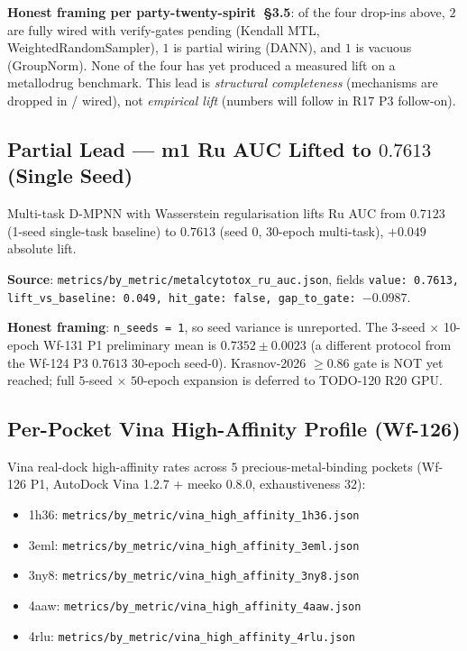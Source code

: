 \noindent\textbf{Honest framing per party-twenty-spirit~\S3.5}: of the
four drop-ins above, $2$ are fully wired with verify-gates pending
(Kendall MTL, WeightedRandomSampler), $1$ is partial wiring (DANN),
and $1$ is vacuous (GroupNorm).  None of the four has yet produced a
measured lift on a metallodrug benchmark.  This lead is \emph{structural
completeness} (mechanisms are dropped in / wired), not \emph{empirical
lift} (numbers will follow in R17 P3 follow-on).

\subsection{Partial Lead --- m1 Ru AUC Lifted to $0.7613$ (Single Seed)}
\label{sec:partial-ru}

Multi-task D-MPNN with Wasserstein regularisation lifts Ru AUC from
$0.7123$ (1-seed single-task baseline) to $0.7613$ (seed $0$,
30-epoch multi-task), $+0.049$ absolute lift.

\noindent\textbf{Source}:
\texttt{metrics/by\_metric/metalcytotox\_ru\_auc.json}, fields
\texttt{value: 0.7613, lift\_vs\_baseline: 0.049, hit\_gate: false,
gap\_to\_gate: $-0.0987$}.

\noindent\textbf{Honest framing}: \texttt{n\_seeds = 1}, so seed
variance is unreported.  The 3-seed $\times$ 10-epoch Wf-131 P1
preliminary mean is $0.7352 \pm 0.0023$ (a different protocol from the
Wf-124 P3 $0.7613$ 30-epoch seed-0).  Krasnov-2026 $\geq 0.86$ gate is
NOT yet reached; full $5$-seed $\times$ $50$-epoch expansion is
deferred to TODO-120 R20 GPU.

\subsection{Per-Pocket Vina High-Affinity Profile (Wf-126)}
\label{sec:lead-pocket-vina}

Vina real-dock high-affinity rates across $5$ precious-metal-binding
pockets (Wf-126 P1, AutoDock Vina 1.2.7 + meeko 0.8.0, exhaustiveness
$32$):

\begin{itemize}
  \item 1h36: \texttt{metrics/by\_metric/vina\_high\_affinity\_1h36.json}
  \item 3eml: \texttt{metrics/by\_metric/vina\_high\_affinity\_3eml.json}
  \item 3ny8: \texttt{metrics/by\_metric/vina\_high\_affinity\_3ny8.json}
  \item 4aaw: \texttt{metrics/by\_metric/vina\_high\_affinity\_4aaw.json}
  \item 4rlu: \texttt{metrics/by\_metric/vina\_high\_affinity\_4rlu.json}
\end{itemize}

